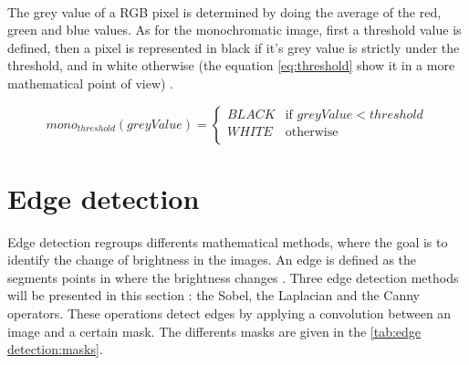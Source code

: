 
~~

The grey value of a RGB pixel is determined by doing the average of the red, green and blue values. As for the monochromatic image, first a threshold value is defined, then a pixel is represented in black if it's grey value is strictly under the threshold, and in white otherwise (the equation \ref{eq:threshold} show it in a more mathematical point of view) \cite{bib:image:Threshold}.

\begin{equation} \label{eq:threshold}
mono_{threshold}(greyValue) = 
	\begin{cases}
		BLACK & \text{if } greyValue < threshold \\
		WHITE & \text{otherwise} \\ 
	\end{cases}
\end{equation}







\section{Edge detection}

Edge detection regroups differents mathematical methods, where the goal is to identify the change of brightness in the images. An edge is defined as the segments points in where the brightness changes \cite{bib:filter:wikipedia}. Three edge detection methods will be presented in this section : the Sobel, the Laplacian and the Canny operators. These operations detect edges by applying a convolution between an image and a certain mask. The differents masks are given in the \vref{tab:edge detection:masks}.

